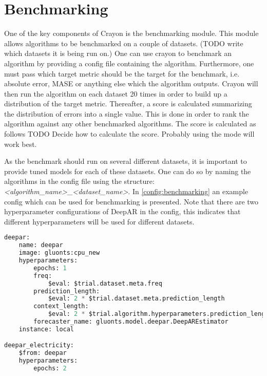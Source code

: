 \section{Benchmarking}
\label{subsec:benchmarking}
One of the key components of Crayon is the benchmarking module. This module allows algorithms to be benchmarked on a couple of datasets. (TODO write which datasets it is being run on.) 
One can use crayon to benchmark an algorithm by providing a config file containing the algorithm. Furthermore, one must pass which target metric should be the target for the benchmark, i.e. absolute error, MASE or anything else which the algorithm outputs. Crayon will then run the algorithm on each dataset 20 times in order to build up a distribution of the target metric. Thereafter, a score is calculated summarizing the distribution of errors into a single value. This is done in order to rank the algorithm against any other benchmarked algorithms. The score is calculated as follows TODO Decide how to calculate the score. Probably using the mode will work best.

As the benchmark should run on several different datasets, it is important to provide tuned models for each of these datasets. One can do so by naming the algorithms in the config file using the structure:\textit{ <algorithm\_name>\_<dataset\_name>}. In \ref{config:benchmarking} an example config which can be used for benchmarking is presented. Note that there are two  hyperparameter configurations of DeepAR in the config, this indicates that different hyperparameters will be used for different datasets. 

\begin{lstlisting}[language=Python, label={config:benchmarking}, caption=Config file for benchmarking using Crayon. Note that \textit{deepar\_electricity} has a different hyperparameter configuration thus these hyperparameters will be used when benchmarking the algorithm on the electricity dataset.]
deepar:
    name: deepar
    image: gluonts:cpu_new
    hyperparameters:
        epochs: 1
        freq:
            $eval: $trial.dataset.meta.freq
        prediction_length:
            $eval: 2 * $trial.dataset.meta.prediction_length
        context_length:
            $eval: 2 * $trial.algorithm.hyperparameters.prediction_length
        forecaster_name: gluonts.model.deepar.DeepAREstimator    
    instance: local

deepar_electricity:
    $from: deepar
    hyperparameters:
        epochs: 2
\end{lstlisting}

